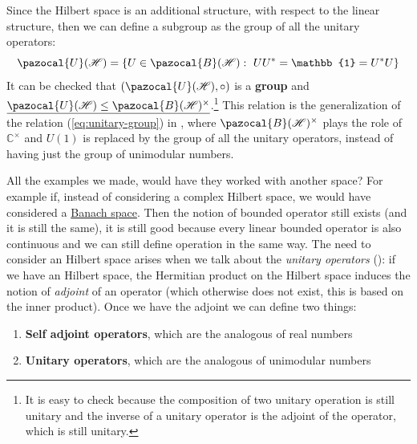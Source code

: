 \documentclass[../main.tex]{subfiles}
\begin{document}
\begin{example}
Since the Hilbert space is an additional structure, with respect to the linear structure, then we can define a subgroup as the group of all the unitary operators:
\[
\pazocal{U}(\mathcal{H})=\Bqty{U\in\pazocal{B}(\mathcal{H}): \ UU^\ast = \mathbb{1}=U^\ast U}
\]
It can be checked that $\pqty{\pazocal{U}(\mathcal{H}), \circ}$ is a \textbf{group} and $\underline{\pazocal{U}(\mathcal{H})\leq\pazocal{B}(\mathcal{H})^\times}$.\footnote{It is easy to check because the composition of two unitary operation is still unitary and the inverse of a unitary operator is the adjoint of the operator, which is still unitary.} This relation is the generalization of the relation (\ref{eq:unitary-group}) in , where $\pazocal{B}(\mathcal{H})^\times$ plays the role of $\mathbb{C}^\times$ and $U(1)$ is replaced by the group of all the unitary operators, instead of having just the group of unimodular numbers.
\end{example}
All the examples we made, would have they worked with another space? For example if, instead of considering a complex Hilbert space, we would have considered a \href{https://it.wikipedia.org/wiki/Spazio_di_Banach}{Banach space}. Then the notion of bounded operator still exists (and it is still the same), it is still good because every linear bounded operator is also continuous and we can still define operation in the same way. The need to consider an Hilbert space arises when we talk about the \textit{unitary operators} (): if we have an Hilbert space, the Hermitian product on the Hilbert space induces the notion of \textit{adjoint} of an operator (which otherwise does not exist, this is based on the inner product). Once we have the adjoint we can define two things:
\begin{enumerate}
    \item \textbf{Self adjoint operators}, which are the analogous of real numbers
    \item \textbf{Unitary operators}, which are the analogous of unimodular numbers
\end{enumerate}
\end{document}
